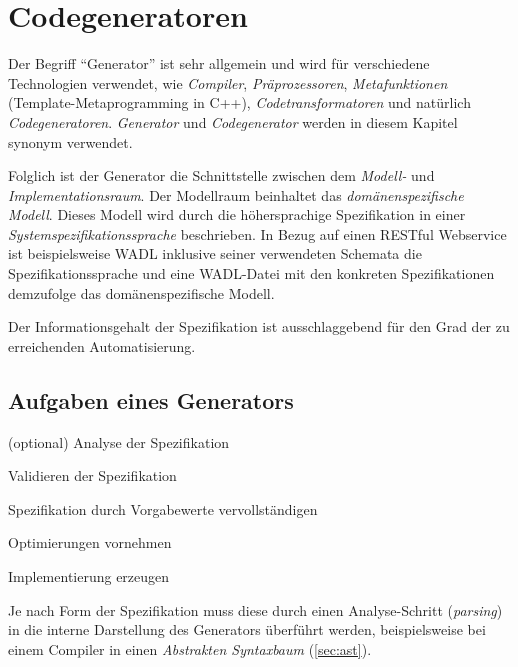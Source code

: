 \section{Codegeneratoren}

Der Begriff \enquote{Generator} ist sehr allgemein und wird für verschiedene Technologien verwendet, wie \emph{Compiler}, \emph{Präprozessoren}, \emph{Metafunktionen} (Template-Metaprogramming in C++), \emph{Codetransformatoren} und natürlich \emph{Codegeneratoren}. 
\emph{Generator} und \emph{Codegenerator} werden in diesem Kapitel synonym verwendet.


Folglich ist der Generator die Schnittstelle zwischen dem \emph{Modell-} und \emph{Implementationsraum}. Der Modellraum beinhaltet das \emph{domänenspezifische Modell}. Dieses Modell wird durch die höhersprachige Spezifikation in einer \emph{Systemspezifikationssprache} beschrieben. In Bezug auf einen \gls{RESTful} Webservice ist beispielsweise \gls{WADL} inklusive seiner verwendeten Schemata die Spezifikationssprache und eine \gls{WADL}-Datei mit den konkreten Spezifikationen demzufolge das domänenspezifische Modell.

Der Informationsgehalt der Spezifikation ist ausschlaggebend für den Grad der zu erreichenden Automatisierung.

\subsection{Aufgaben eines Generators}
\label{sec:generator_tasks}

\begin{compactenum}
    \item[{\footnotesize (optional)}] Analyse der Spezifikation
    \item Validieren der Spezifikation
    \item Spezifikation durch Vorgabewerte vervollständigen
    \item Optimierungen vornehmen
    \item Implementierung erzeugen
\end{compactenum}

Je nach Form der Spezifikation muss diese durch einen Analyse-Schritt (\emph{parsing}) in die interne Darstellung des Generators überführt werden, beispielsweise bei einem Compiler in einen \emph{Abstrakten Syntaxbaum} (\cref{sec:ast}).

